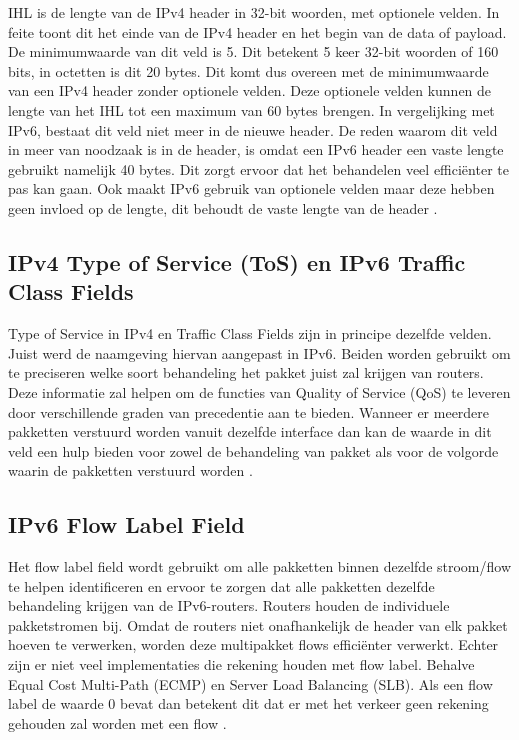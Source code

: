 IHL is de lengte van de IPv4 header in 32-bit woorden, met optionele velden. In feite toont dit het einde van de IPv4 header en het begin van de data of payload. De minimumwaarde van dit veld is 5. Dit betekent 5 keer 32-bit woorden of 160 bits, in octetten is dit 20 bytes. Dit komt dus overeen met de minimumwaarde van een IPv4 header zonder optionele velden. Deze optionele velden kunnen de lengte van het IHL tot een maximum van 60 bytes brengen. In vergelijking met IPv6, bestaat dit veld niet meer in de nieuwe header. De reden waarom dit veld in meer van noodzaak is in de header, is omdat een IPv6 header een vaste lengte gebruikt namelijk 40 bytes. Dit zorgt ervoor dat het behandelen veel efficiënter te pas kan gaan. Ook maakt IPv6 gebruik van optionele velden maar deze hebben geen invloed op de lengte, dit behoudt de vaste lengte van de header \autocite{Graziani2017}.

\subsection{IPv4 Type of Service (ToS) en IPv6 Traffic Class Fields}

Type of Service in IPv4 en Traffic Class Fields zijn in principe dezelfde velden. Juist werd de naamgeving hiervan aangepast in IPv6. Beiden worden gebruikt om te preciseren welke soort behandeling het pakket juist zal krijgen van routers. Deze informatie zal helpen om de functies van Quality of Service (QoS) te leveren door verschillende graden van precedentie aan te bieden. Wanneer er meerdere pakketten verstuurd worden vanuit dezelfde interface dan kan de waarde in dit veld een hulp bieden voor zowel de behandeling van pakket als voor de volgorde waarin de pakketten verstuurd worden \autocite{Graziani2017}.

\subsection{IPv6 Flow Label Field}

Het flow label field wordt gebruikt om alle pakketten binnen dezelfde stroom/flow te helpen identificeren en ervoor te zorgen dat alle pakketten dezelfde behandeling krijgen van de IPv6-routers. Routers houden de individuele pakketstromen bij. Omdat de routers niet onafhankelijk de header van elk pakket hoeven te verwerken, worden deze multipakket flows efficiënter verwerkt. Echter zijn er niet veel implementaties die rekening houden met flow label. Behalve Equal Cost Multi-Path (ECMP) en Server Load Balancing (SLB). Als een flow label de waarde 0 bevat dan betekent dit dat er met het verkeer geen rekening gehouden zal worden met een flow \autocite{Graziani2017}.

